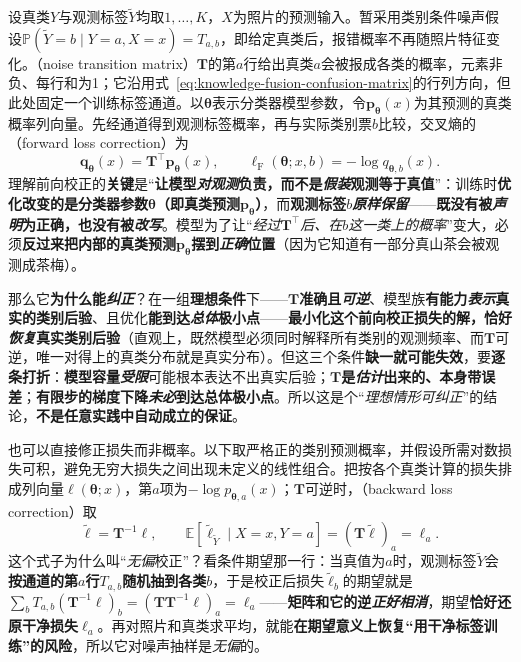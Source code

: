设真类$Y$与观测标签$\widetilde Y$均取$1,\ldots,K$，$X$为照片的预测输入。暂采用类别条件噪声假设$\mathbb P(\widetilde Y=b\mid Y=a,X=x)=T_{a,b}$，即给定真类后，报错概率不再随照片特征变化。（noise transition matrix）$\bm T$的第$a$行给出真类$a$会被报成各类的概率，元素非负、每行和为1；它沿用式~\eqref{eq:knowledge-fusion-confusion-matrix}的行列方向，但此处固定一个训练标签通道。以$\bm\theta$表示分类器模型参数，令$\bm p_{\bm\theta}(x)$为其预测的真类概率列向量。先经通道得到观测标签概率，再与实际类别票$b$比较，交叉熵的（forward loss correction）为
\begin{equation}
  \bm q_{\bm\theta}(x)=\bm T^{\top}\bm p_{\bm\theta}(x),
  \qquad
  \ell_{\mathrm F}(\bm\theta;x,b)
  =-\log q_{\bm\theta,b}(x).
  \label{eq:ka-forward-correction}
\end{equation}
理解前向校正的\textbf{关键}是“\textbf{让模型\emph{对观测}负责，而不是\emph{假装}观测等于真值}”：训练时\textbf{优化改变的是分类器参数$\bm{\theta}$（即真类预测$\bm p_{\bm{\theta}}$）}，而\textbf{观测标签$b$\emph{原样保留}}——\textbf{既没有被\emph{声明}为正确，也没有被\emph{改写}}。模型为了让“\emph{经过$\bm T^{\top}$后、在$b$这一类上的概率}”变大，必须\textbf{反过来把内部的真类预测$\bm p_{\bm{\theta}}$摆到\emph{正确}位置}（因为它知道有一部分真山茶会被观测成茶梅）。

那么它\textbf{为什么能\emph{纠正}}？在一组\textbf{理想条件}下——$\bm T$\textbf{准确且\emph{可逆}}、模型族\textbf{有能力\emph{表示}真实的类别后验}、且优化\textbf{能到达\emph{总体}极小点}——\textbf{最小化这个前向校正损失的解，恰好\emph{恢复}真实类别后验}（直观上，既然模型必须同时解释所有类别的观测频率、而$\bm T$可逆，唯一对得上的真类分布就是真实分布）。但这三个条件\textbf{缺一就可能失效}，要\textbf{逐条打折}：\textbf{模型容量\emph{受限}}可能根本表达不出真实后验；\textbf{$\bm T$是\emph{估计}出来的、本身带误差}；\textbf{有限步的梯度下降\emph{未必}到达总体极小点}。所以这是个“\emph{理想情形可纠正}”的结论，\textbf{不是任意实践中自动成立的保证}。

也可以直接修正损失而非概率。以下取严格正的类别预测概率，并假设所需对数损失可积，避免无穷大损失之间出现未定义的线性组合。把按各个真类计算的损失排成列向量$\bm\ell(\bm\theta;x)$，第$a$项为$-\log p_{\bm\theta,a}(x)$；$\bm T$可逆时，（backward loss correction）取
\begin{equation}
  \widetilde{\bm\ell}=\bm T^{-1}\bm\ell,
  \qquad
  \mathbb E[\widetilde\ell_{\widetilde Y}\mid X=x,Y=a]
  =(\bm T\widetilde{\bm\ell})_a=\ell_a.
  \label{eq:ka-backward-correction}
\end{equation}
这个式子为什么叫“\emph{无偏}校正”？看条件期望那一行：当真值为$a$时，观测标签$\widetilde Y$会\textbf{按通道的第$a$行}$T_{a,b}$\textbf{随机抽到各类}$b$，于是校正后损失$\widetilde\ell_b$的期望就是$\sum_b T_{a,b}(\bm{T}^{-1}\bm\ell)_b=(\bm{T}\bm{T}^{-1}\bm\ell)_a=\ell_a$——\textbf{矩阵和它的逆\emph{正好相消}}，期望\textbf{恰好还原干净损失}$\ell_a$。再对照片和真类求平均，就能\textbf{在期望意义上恢复“用干净标签训练”的风险}，所以它对噪声抽样是\emph{无偏}的。

